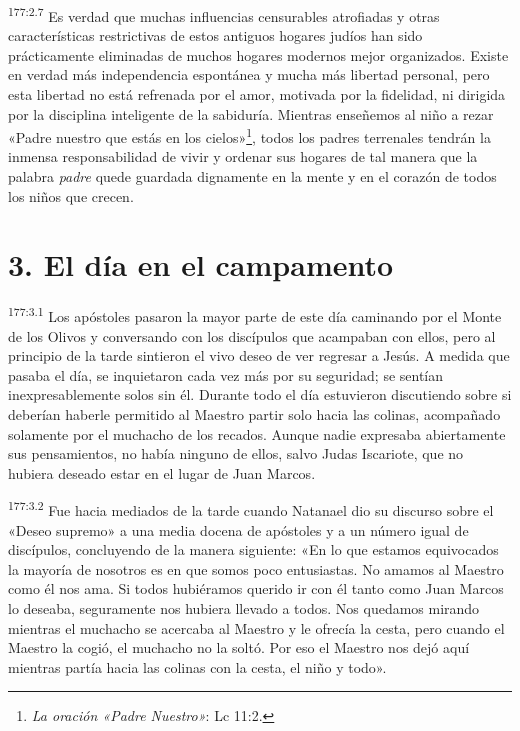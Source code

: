 \par 
\textsuperscript{177:2.7} Es verdad que muchas influencias censurables atrofiadas y otras características restrictivas de estos antiguos hogares judíos han sido prácticamente eliminadas de muchos hogares modernos mejor organizados. Existe en verdad más independencia espontánea y mucha más libertad personal, pero esta libertad no está refrenada por el amor, motivada por la fidelidad, ni dirigida por la disciplina inteligente de la sabiduría. Mientras enseñemos al niño a rezar «Padre nuestro que estás en los cielos»\footnote{\textit{La oración «Padre Nuestro»}: Lc 11:2.}, todos los padres terrenales tendrán la inmensa responsabilidad de vivir y ordenar sus hogares de tal manera que la palabra \textit{padre} quede guardada dignamente en la mente y en el corazón de todos los niños que crecen.

\section*{3. El día en el campamento}
\par 
\textsuperscript{177:3.1} Los apóstoles pasaron la mayor parte de este día caminando por el Monte de los Olivos y conversando con los discípulos que acampaban con ellos, pero al principio de la tarde sintieron el vivo deseo de ver regresar a Jesús. A medida que pasaba el día, se inquietaron cada vez más por su seguridad; se sentían inexpresablemente solos sin él. Durante todo el día estuvieron discutiendo sobre si deberían haberle permitido al Maestro partir solo hacia las colinas, acompañado solamente por el muchacho de los recados. Aunque nadie expresaba abiertamente sus pensamientos, no había ninguno de ellos, salvo Judas Iscariote, que no hubiera deseado estar en el lugar de Juan Marcos.

\par 
\textsuperscript{177:3.2} Fue hacia mediados de la tarde cuando Natanael dio su discurso sobre el «Deseo supremo» a una media docena de apóstoles y a un número igual de discípulos, concluyendo de la manera siguiente: «En lo que estamos equivocados la mayoría de nosotros es en que somos poco entusiastas. No amamos al Maestro como él nos ama. Si todos hubiéramos querido ir con él tanto como Juan Marcos lo deseaba, seguramente nos hubiera llevado a todos. Nos quedamos mirando mientras el muchacho se acercaba al Maestro y le ofrecía la cesta, pero cuando el Maestro la cogió, el muchacho no la soltó. Por eso el Maestro nos dejó aquí mientras partía hacia las colinas con la cesta, el niño y todo».

